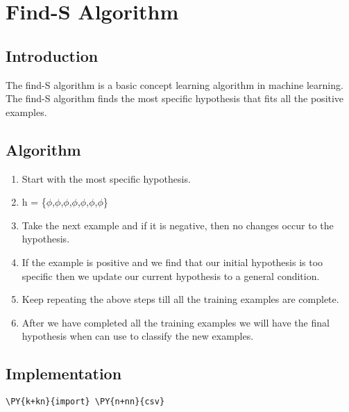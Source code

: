 \hypertarget{find-s-algorithm}{%
\chapter{Find-S Algorithm}\label{find-s-algorithm}}

\section{Introduction}
The find-S algorithm is a basic concept learning algorithm in machine
learning. The find-S algorithm finds the most specific hypothesis that
fits all the positive examples.

\hypertarget{algorithm}{%
\section{Algorithm}\label{algorithm}}

\begin{enumerate}
\def\labelenumi{\arabic{enumi}.}
\item
  Start with the most specific hypothesis.
\item
  h = \{\(\phi\),\(\phi\),\(\phi\),\(\phi\),\(\phi\),\(\phi\),\(\phi\)\}
\item
  Take the next example and if it is negative, then no changes occur to
  the hypothesis.
\item
  If the example is positive and we find that our initial hypothesis is
  too specific then we update our current hypothesis to a general
  condition.
\item
  Keep repeating the above steps till all the training examples are
  complete.
\item
  After we have completed all the training examples we will have the
  final hypothesis when can use to classify the new examples.
\end{enumerate}

\section{Implementation}
    \begin{tcolorbox}[breakable, size=fbox, boxrule=1pt, pad at break*=1mm,colback=cellbackground, colframe=cellborder]
\begin{Verbatim}[commandchars=\\\{\}]
\PY{k+kn}{import} \PY{n+nn}{csv}
\end{Verbatim}
\end{tcolorbox}

